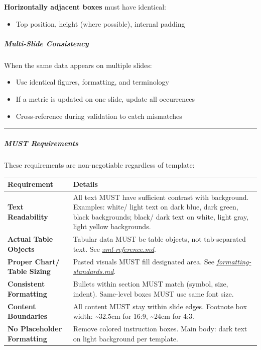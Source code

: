 \documentclass[11pt]{article}
\begin{document}
\textbf{Horizontally adjacent boxes} must have identical:

\begin{itemize}[leftmargin=*,itemsep=2pt,topsep=2pt]
\item {} Top position, height (where possible), internal padding
\end{itemize}

\subparagraph{Multi-Slide Consistency}\mbox{}\par

When the same data appears on multiple slides:

\begin{itemize}[leftmargin=*,itemsep=2pt,topsep=2pt]
\item {} Use identical figures, formatting, and terminology
\item {} If a metric is updated on one slide, update all occurrences
\item {} Cross-reference during validation to catch mismatches
\end{itemize}

\vspace{0.5em}\hrule\vspace{0.5em}

\subparagraph{MUST Requirements}\mbox{}\par

These requirements are non-negotiable regardless of template:


\begingroup
\small
\setlength{\tabcolsep}{2pt}
\begin{longtable}{>{\RaggedRight\arraybackslash\hspace{0pt}}p{}>{\RaggedRight\arraybackslash\hspace{0pt}}p{}}
\toprule
{} \textbf{Requirement} & \textbf{Details} \\
\midrule
{} \textbf{Text Readability} & All text MUST have sufficient contrast with background. Examples: white/ light text on dark blue, dark green, black backgrounds; black/ dark text on white, light gray, light yellow backgrounds. \\
{} \textbf{Actual Table Objects} & Tabular data MUST be table objects, not tab-separated text. See \href{reference/ xml-reference.md\#table-implementation}{\emph{xml-reference.md}}. \\
{} \textbf{Proper Chart/ Table Sizing} & Pasted visuals MUST fill designated area. See \href{reference/ formatting-standards.md\#chart-and-image-handling}{\emph{formatting-standards.md}}. \\
{} \textbf{Consistent Formatting} & Bullets within section MUST match (symbol, size, indent). Same-level boxes MUST use same font size. \\
{} \textbf{Content Boundaries} & All content MUST stay within slide edges. Footnote box width: \textasciitilde{}32.5cm for 16:9, \textasciitilde{}24cm for 4:3. \\
{} \textbf{No Placeholder Formatting} & Remove colored instruction boxes. Main body: dark text on light background per template. \\
\bottomrule
\end{longtable}
\endgroup
\end{document}
